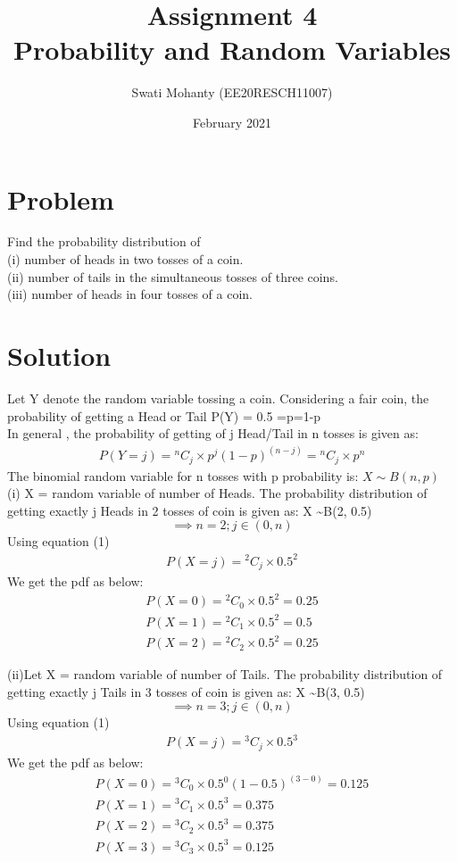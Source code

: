 \documentclass[journal,12pt,twocolumn]{IEEEtran}
\title{Assignment 4
\\Probability and Random Variables }
\author{Swati Mohanty (EE20RESCH11007) }
\date{February 2021}
\newcommand*{\Comb}[2]{{}^{#1}C_{#2}}%
\begin{document}
\maketitle


\section{Problem}
Find the probability distribution of
\\(i) number of heads in two tosses of a coin.
\\(ii) number of tails in the simultaneous tosses
of three coins.
\\(iii) number of heads in four tosses of a coin.

\section{Solution}
Let Y denote the random variable tossing a coin. Considering a fair coin, the probability of getting a Head or Tail P(Y) = 0.5 =p=1-p
\\In general , the probability of getting of j Head/Tail in n tosses is given as:
\begin{align}
    P(Y = j) = \Comb{n}{j}\times { p^j (1-p)^{(n-j)}} = \Comb{n}{j}\times { p^n } 
\end{align}
The binomial random variable for n tosses with p probability is:
$X \sim B(n, p) $
\\(i)
 X = random variable of number of Heads.
The probability distribution of getting exactly j Heads in 2 tosses of coin is given as: X \sim B(2, 0.5)
 \[\implies n=2; j \in (0,n)\]
Using equation (1)
\begin{align}
    P(X = j)  =\Comb{2}{j}\times { 0.5^2}
\end{align}
We get the pdf as below:
\begin{align}
    P(X=0) =\Comb{2}{0}\times { 0.5^2}
    =0.25
    \\P(X=1) = \Comb{2}{1}\times { 0.5^2} = 0.5
    \\P(X=2) = \Comb{2}{2}\times { 0.5^2} = 0.25
\end{align}


(ii)Let X = random variable of number of Tails.
The probability distribution of getting exactly j Tails in 3 tosses of coin is given as: X \sim B(3, 0.5) 
\[\implies n=3; j \in (0,n)\]
Using equation (1)
\begin{align}
    P(X = j)  =\Comb{3}{j}\times { 0.5^3}
\end{align}
We get the pdf as below:
\begin{align}
    P(X=0) = \Comb{3}{0}\times { 0.5^0 (1-0.5)^{(3-0)}}
    =0.125
    \\P(X=1) = \Comb{3}{1}\times { 0.5^3} = 0.375
    \\P(X=2) = \Comb{3}{2}\times { 0.5^3} = 0.375
    \\P(X=3) = \Comb{3}{3}\times { 0.5^3} = 0.125
\end{align}
\end{document}
